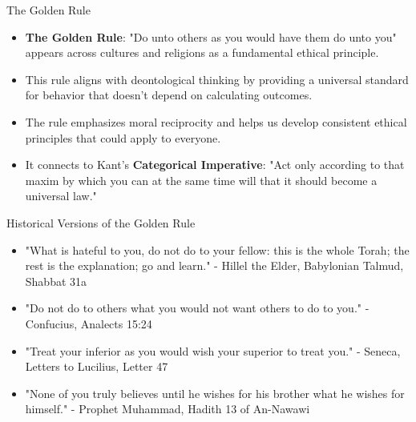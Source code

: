 \documentclass{beamer}
\begin{document}
\begin{frame}{The Golden Rule}
\begin{itemize}
    \item \textbf{The Golden Rule}: "Do unto others as you would have them do unto you" appears across cultures and religions as a fundamental ethical principle.
    
    \item This rule aligns with deontological thinking by providing a universal standard for behavior that doesn't depend on calculating outcomes.
    
    \item The rule emphasizes moral reciprocity and helps us develop consistent ethical principles that could apply to everyone.
    
    \item It connects to Kant's \textbf{Categorical Imperative}: "Act only according to that maxim by which you can at the same time will that it should become a universal law."
\end{itemize}
\end{frame}

\begin{frame}{Historical Versions of the Golden Rule}
\begin{itemize}
   \item "What is hateful to you, do not do to your fellow: this is the whole Torah; the rest is the explanation; go and learn." 
   - Hillel the Elder, Babylonian Talmud, Shabbat 31a
   
   \item "Do not do to others what you would not want others to do to you."
   - Confucius, Analects 15:24
   
   \item "Treat your inferior as you would wish your superior to treat you."
   - Seneca, Letters to Lucilius, Letter 47
   
   \item "None of you truly believes until he wishes for his brother what he wishes for himself."
   - Prophet Muhammad, Hadith 13 of An-Nawawi
\end{itemize}
\end{frame}
\end{document}
